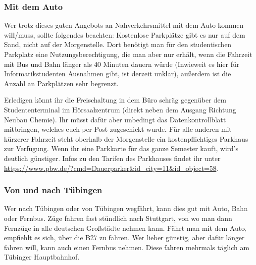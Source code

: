 \subsubsection*{Mit dem Auto}
Wer trotz dieses guten Angebots an Nahverkehrsmittel mit dem Auto kommen will/muss, sollte folgendes beachten: Kostenlose Parkplätze gibt es nur auf dem Sand, nicht auf der Morgenstelle.  Dort benötigt man für den studentischen Parkplatz eine Nutzungsberechtigung, die man aber nur erhält, wenn die Fahrzeit mit Bus und Bahn länger als 40 Minuten dauern würde (Inwieweit es hier für Informatikstudenten Ausnahmen gibt, ist derzeit unklar), außerdem ist die Anzahl an Parkplätzen sehr begrenzt.

 Erledigen könnt ihr die Freischaltung in dem Büro schräg gegenüber dem Studententerminal im Hörsaalzentrum (direkt neben dem Ausgang Richtung Neubau Chemie). Ihr müsst dafür aber unbedingt das Datenkontrollblatt mitbringen, welches euch per Post zugeschickt wurde. Für alle anderen mit kürzerer Fahrzeit steht oberhalb der Morgenstelle ein kostenpflichtiges Parkhaus zur Verfügung. Wenn ihr eine Parkkarte für das ganze Semester kauft, wird's deutlich günstiger. Infos zu den Tarifen des Parkhauses findet ihr unter \url{https://www.pbw.de/?cmd=Dauerparker&id_city=11&id_object=58}.

\subsubsection*{Von und nach Tübingen}
Wer nach Tübingen oder von Tübingen wegfährt, kann dies gut mit Auto, Bahn oder Fernbus. Züge fahren fast stündlich nach Stuttgart, von wo man dann Fernzüge in alle deutschen Großstädte nehmen kann. Fährt man mit dem Auto, empfiehlt es sich, über die B27 zu fahren. Wer lieber günstig, aber dafür länger fahren will, kann auch einen Fernbus nehmen. Diese fahren mehrmals täglich am Tübinger Hauptbahnhof.